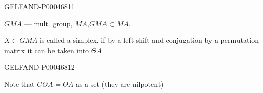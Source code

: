 \begin{GelfandAdjacentEvidence}{GELFAND-P000468}{11}


$GMA$ — mult. group, $MA$,\quad $GMA\subset MA$.


$X\subset GMA$ is called a simplex, if by a left shift and conjugation by a permutation matrix it can be taken into $\Theta A$
\end{GelfandAdjacentEvidence}
\begin{GelfandAdjacentEvidence}{GELFAND-P000468}{12}


Note that $G\Theta A=\Theta A$ as a set (they are nilpotent)
\end{GelfandAdjacentEvidence}



